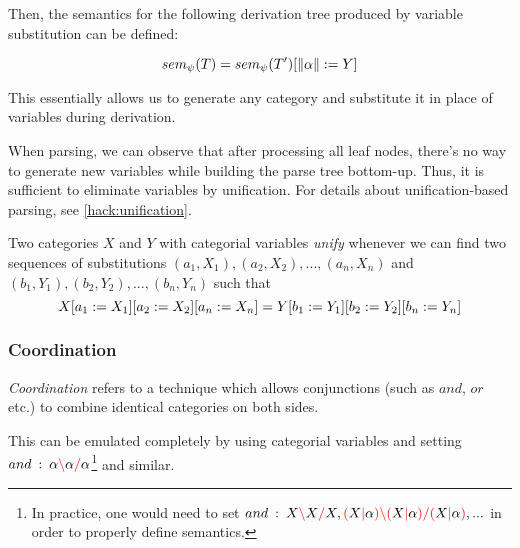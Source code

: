 \documentclass[main.tex]{subfiles}
\begin{document}
Then, the semantics for the following derivation tree produced by variable
substitution can be defined:
\begin{center}
\end{center}

\[ sem_{\psi}(T) = sem_{\psi}(T') [ \|\alpha\| := Y ] \]

This essentially allows us to generate any category and substitute it in place
of variables during derivation.

When parsing, we can observe that after processing all leaf nodes,
there's no way to generate new variables while building the parse tree
bottom-up. Thus, it is sufficient to eliminate variables by unification.
For details about unification-based parsing, see \cref{hack:unification}.

Two categories $X$ and $Y$ with categorial variables \emph{unify} whenever we can
find two sequences of substitutions $(a_1, X_1), (a_2, X_2), ..., (a_n, X_n)$
and $(b_1, Y_1), (b_2, Y_2), ..., (b_n, Y_n)$ such that
\[ X [ a_1 := X_1 ] [ a_2 := X_2 ] [ a_n := X_n ]
 = Y [ b_1 := Y_1 ] [ b_2 := Y_2 ] [ b_n := Y_n ] \]

\subsubsection{Coordination}
\emph{Coordination} refers to a technique which allows conjunctions (such as
$and$, $or$ etc.) to combine identical categories on both sides.

This can be emulated completely by using categorial variables and setting
$and \hspace{0.5em} {:} \hspace{0.5em} \alpha \textcolor{red}{\backslash} \alpha \textcolor{red}{/} \alpha $\footnote{
    In practice, one would need to set
    $and \hspace{0.5em} {:} \hspace{0.5em} X \textcolor{red}{\backslash} X \textcolor{red}{/} X, \textcolor{red}{(} X \textcolor{red}{|} \alpha \textcolor{red}{)} \textcolor{red}{\backslash} \textcolor{red}{(} X \textcolor{red}{|} \alpha \textcolor{red}{)} \textcolor{red}{/} \textcolor{red}{(} X \textcolor{red}{|} \alpha \textcolor{red}{)}, ...$
    in order to properly define semantics.
} and similar.
\end{document}

